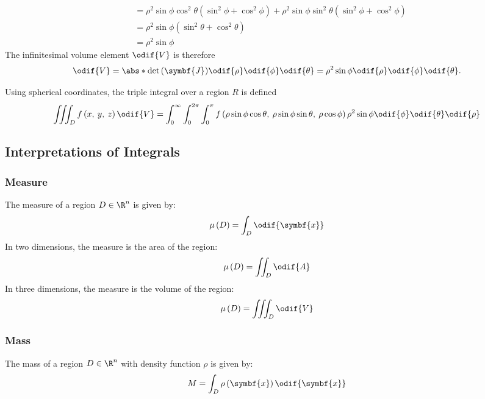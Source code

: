 \documentclass{article}
\begin{document}
\begin{definition}
\begin{align*}
                                       & = \rho^2 \sin{\phi} \cos^2{\theta} \left( \sin^2{\phi} + \cos^2{\phi} \right) + \rho^2 \sin{\phi} \sin^2{\theta} \left( \sin^2{\phi} + \cos^2{\phi} \right)                                          \\
                                       & = \rho^2 \sin{\phi} \left( \sin^2{\theta} + \cos^2{\theta} \right)                                                                                                                                   \\
                                       & = \rho^2 \sin{\phi}
    \end{align*}
    The infinitesimal volume element \(\odif{V}\) is therefore
    \begin{equation*}
        \odif{V} = \abs*{\det{\left( \symbf{J} \right)}} \odif{\rho}\odif{\phi}\odif{\theta} = \rho^2 \sin{\phi} \odif{\rho}\odif{\phi}\odif{\theta}.
    \end{equation*}
\end{definition}
Using spherical coordinates, the triple integral over a region \(R\) is
defined
\begin{equation*}
    \iiint_D f\left( x,\: y,\: z \right) \odif{V} = \int_0^\infty \int_0^{2\pi} \int_0^\pi f\left( \rho \sin{\phi} \cos{\theta},\: \rho \sin{\phi} \sin{\theta},\: \rho \cos{\phi} \right) \rho^2 \sin{\phi} \odif{\phi} \odif{\theta} \odif{\rho}
\end{equation*}
\subsection{Interpretations of Integrals}
\subsubsection*{Measure}
The measure of a region \(D \in \R^n\) is given by:
\begin{equation*}
    \mu\left( D \right) = \int_D \odif{\symbf{x}}
\end{equation*}
In two dimensions, the measure is the area of the region:
\begin{equation*}
    \mu\left( D \right) = \iint_D \odif{A}
\end{equation*}
In three dimensions, the measure is the volume of the region:
\begin{equation*}
    \mu\left( D \right) = \iiint_D \odif{V}
\end{equation*}
\subsubsection*{Mass}
The mass of a region \(D \in \R^n\) with density function \(\rho\) is
given by:
\begin{equation*}
    M = \int_D \rho\left( \symbf{x} \right) \odif{\symbf{x}}
\end{equation*}
\end{document}
